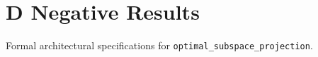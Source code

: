 \section{D Negative Results}

Formal architectural specifications for \texttt{optimal_subspace_projection}.
